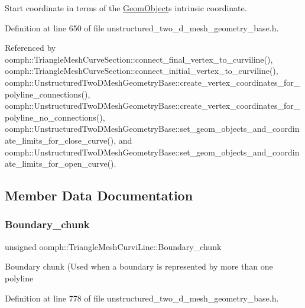 Start coordinate in terms of the \hyperlink{classoomph_1_1GeomObject}{Geom\+Object}\textquotesingle{}s intrinsic coordinate. 



Definition at line 650 of file unstructured\+\_\+two\+\_\+d\+\_\+mesh\+\_\+geometry\+\_\+base.\+h.



Referenced by oomph\+::\+Triangle\+Mesh\+Curve\+Section\+::connect\+\_\+final\+\_\+vertex\+\_\+to\+\_\+curviline(), oomph\+::\+Triangle\+Mesh\+Curve\+Section\+::connect\+\_\+initial\+\_\+vertex\+\_\+to\+\_\+curviline(), oomph\+::\+Unstructured\+Two\+D\+Mesh\+Geometry\+Base\+::create\+\_\+vertex\+\_\+coordinates\+\_\+for\+\_\+polyline\+\_\+connections(), oomph\+::\+Unstructured\+Two\+D\+Mesh\+Geometry\+Base\+::create\+\_\+vertex\+\_\+coordinates\+\_\+for\+\_\+polyline\+\_\+no\+\_\+connections(), oomph\+::\+Unstructured\+Two\+D\+Mesh\+Geometry\+Base\+::set\+\_\+geom\+\_\+objects\+\_\+and\+\_\+coordinate\+\_\+limits\+\_\+for\+\_\+close\+\_\+curve(), and oomph\+::\+Unstructured\+Two\+D\+Mesh\+Geometry\+Base\+::set\+\_\+geom\+\_\+objects\+\_\+and\+\_\+coordinate\+\_\+limits\+\_\+for\+\_\+open\+\_\+curve().



\subsection{Member Data Documentation}
\mbox{\label{classoomph_1_1TriangleMeshCurviLine_aa526197f2a3eb9d7cb024eeaf7262051}} 
\subsubsection{\texorpdfstring{Boundary\+\_\+chunk}{Boundary\_chunk}}
{\footnotesize\ttfamily unsigned oomph\+::\+Triangle\+Mesh\+Curvi\+Line\+::\+Boundary\+\_\+chunk\hspace{0.3cm}{\ttfamily [private]}}

Boundary chunk (Used when a boundary is represented by more than one polyline 

Definition at line 778 of file unstructured\+\_\+two\+\_\+d\+\_\+mesh\+\_\+geometry\+\_\+base.\+h.

